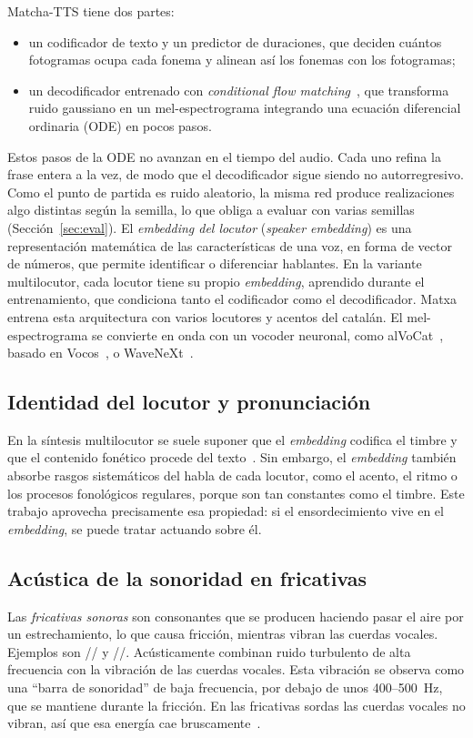 \documentclass[conference]{IEEEtran}
\newcommand{\fz}{\textipa{z}}
\newcommand{\fZ}{\textipa{Z}}
\begin{document}
Matcha-TTS tiene dos partes:
\begin{itemize}
\item un codificador de texto y un predictor de duraciones, que deciden cuántos fotogramas ocupa cada fonema y alinean así los fonemas con los fotogramas;
\item un decodificador entrenado con \textit{conditional flow matching}~\cite{lipman2023flow}, que transforma ruido gaussiano en un mel-espectrograma integrando una ecuación diferencial ordinaria (ODE) en pocos pasos.
\end{itemize}

Estos pasos de la ODE no avanzan en el tiempo del audio. Cada uno refina la frase entera a la vez, de modo que el decodificador sigue siendo no autorregresivo. Como el punto de partida es ruido aleatorio, la misma red produce realizaciones algo distintas según la semilla, lo que obliga a evaluar con varias semillas (Sección~\ref{sec:eval}).
El \emph{embedding del locutor} (\textit{speaker embedding}) es una representación matemática de las características de una voz, en forma de vector de números, que permite identificar o diferenciar hablantes. En la variante multilocutor, cada locutor tiene su propio \textit{embedding}, aprendido durante el entrenamiento, que condiciona tanto el codificador como el decodificador. Matxa~\cite{matxa} entrena esta arquitectura con varios locutores y acentos del catalán. El mel-espectrograma se convierte en onda con un vocoder neuronal, como alVoCat~\cite{alvocat}, basado en Vocos~\cite{siuzdak2023vocos}, o WaveNeXt~\cite{okamoto2023wavenext}.

\subsection{Identidad del locutor y pronunciación}
En la síntesis multilocutor se suele suponer que el \textit{embedding} codifica el timbre y que el contenido fonético procede del texto~\cite{jia2018transfer}. Sin embargo, el \textit{embedding} también absorbe rasgos sistemáticos del habla de cada locutor, como el acento, el ritmo o los procesos fonológicos regulares, porque son tan constantes como el timbre. Este trabajo aprovecha precisamente esa propiedad: si el ensordecimiento vive en el \textit{embedding}, se puede tratar actuando sobre él.

\subsection{Acústica de la sonoridad en fricativas}
Las \emph{fricativas sonoras} son consonantes que se producen haciendo pasar el aire por un estrechamiento, lo que causa fricción, mientras vibran las cuerdas vocales. Ejemplos son /\fz/ y /\fZ/. Acústicamente combinan ruido turbulento de alta frecuencia con la vibración de las cuerdas vocales. Esta vibración se observa como una ``barra de sonoridad'' de baja frecuencia, por debajo de unos 400--500~Hz, que se mantiene durante la fricción. En las fricativas sordas las cuerdas vocales no vibran, así que esa energía cae bruscamente~\cite{stevens1998,ladefoged1996}.
\end{document}
